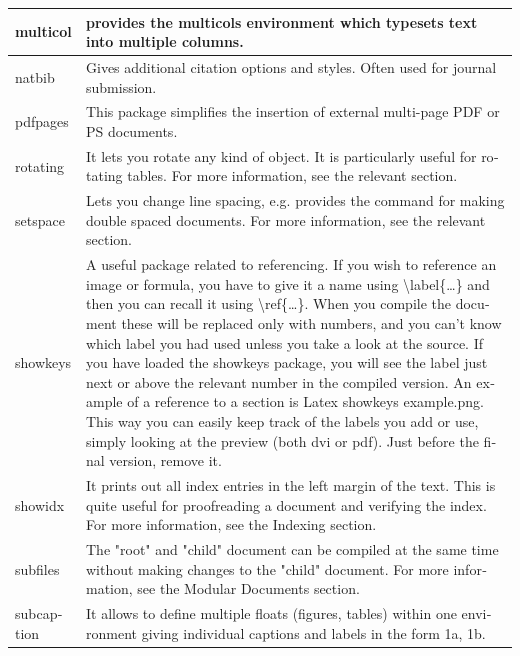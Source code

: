 \begin{latin}
\begin{longtable}{| p{} | p{} |}
multicol &provides the mul­ti­cols environment which typesets text into multiple columns.\\\hline
natbib &Gives additional citation options and styles. Often used for journal submission.\\\hline
pdfpages &This package simplifies the insertion of external multi-page PDF or PS documents.\\\hline
rotating &It lets you rotate any kind of object. It is particularly useful for rotating tables. For more information, see the relevant section.\\\hline
setspace &Lets you change line spacing, e.g. provides the \doublespacing command for making double spaced documents. For more information, see the relevant section.\\\hline
showkeys &A useful package related to referencing. If you wish to reference an image or formula, you have to give it a name using \textbackslash{label}\{\dots\} and then you can recall it using \textbackslash{ref}\{\dots\}. When you compile the document these will be replaced only with numbers, and you can't know which label you had used unless you take a look at the source. If you have loaded the showkeys package, you will see the label just next or above the relevant number in the compiled version. An example of a reference to a section is Latex showkeys example.png. This way you can easily keep track of the labels you add or use, simply looking at the preview (both dvi or pdf). Just before the final version, remove it.\\\hline
showidx &It prints out all index entries in the left margin of the text. This is quite useful for proofreading a document and verifying the index. For more information, see the Indexing section.\\\hline
subfiles &The "root" and "child" document can be compiled at the same time without making changes to the "child" document. For more information, see the Modular Documents section.\\\hline
subcaption &It allows to define multiple floats (figures, tables) within one environment giving individual captions and labels in the form 1a, 1b.\\\hline

\end{longtable}
\end{latin}

